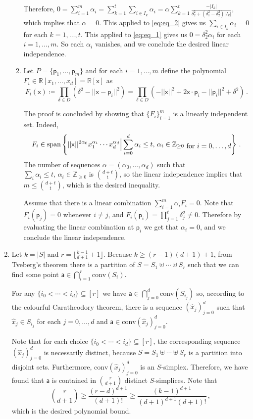 \documentclass[kulak]{tplt}
\theoremstyle{definition}
\newcommand{\R}{\mathbb{R}}
\newcommand{\Z}{\mathbb{Z}}
\newcommand{\vx}{\mathsf{x}}
\newcommand{\va}{\mathsf{a}}
\newcommand{\vp}{\mathsf{p}}
\newcommand{\spn}{\mathrm{span}}
\newcommand{\conv}{\mathrm{conv}}
\begin{document}
\begin{enumerate}
\begin{enumerate}
Therefore, $0 = \sum_{i=1}^m \alpha_i = \sum_{k = 1}^t \sum_{i \in I_k} \alpha_i = \alpha \sum_{k=1}^t \frac{-|I_k|}{\delta_2^2 + (\delta_1^2-\delta_2^2)|I_k|}$, which implies that $\alpha = 0$.
This applied to \eqref{eq:eq_2} gives us $\sum_{i \in I_k} \alpha_i  = 0$ for each $k = 1, \ldots, t$.
This applied to \eqref{eq:eq_1} gives us $ 0 = \delta_2^2 \alpha_ i$ for each $i = 1, \ldots, m$.
So each $\alpha_i $ vanishes, and we conclude the desired linear independence.

\item 
Let $P = \{\vp_1, \ldots, \vp_m \} $ and for each $i=1, \ldots, m$ define the polynomial $F_i \in \R[x_1, \ldots, x_d] = \R[\vx]$ as
$$ F_i ( \vx ) \coloneqq \prod_{\delta \in D} \left( \delta^2 - ||\vx - \vp_i ||^2\right)  =  \prod_{\delta \in D} \left(  - ||\vx ||^2 + 2 \vx \cdot \vp_i - ||\vp_i||^2 + \delta^2\right) \, .$$


The proof is concluded by showing that $\{F_i\}_{i=1}^m$ is a linearly independent set.
Indeed, 
$$F_i \in \spn \left\{ ||\vx||^{2\alpha_0} x_1^{\alpha_1} \cdots x_d^{\alpha_d}\Big| \sum_{i=0}^d \alpha_i \leq t, \, \alpha_i\in \Z_{\geq 0 } \txt{ for $i = 0 , \ldots, d $ }\right\}\, . $$
The number of sequences $\alpha = (\alpha_0, \ldots, \alpha_d)$ such that $ \sum_i \alpha_i \leq t, \, \alpha_i\in \Z_{\geq 0 }$ is $\binom{d+t}{t}$, so the linear independence implies that $m \leq \binom{d+t}{t}$, which is the desired inequality.

Assume that there is a linear combination $ \sum_{i=1}^m \alpha_i F_i = 0 $.
Note that $F_i(\vp_j ) = 0$ whenever $i \neq j$, and $F_i(\vp_i ) = \prod_{j=1}^t \delta_j^2 \neq 0$.
Therefore by evaluating the linear combination at $\vp_i $ we get that $\alpha_i =0$, and we conclude the linear independence.
\end{enumerate}

\item 
Let $k = |S|$ and $r = \lfloor \frac{k-1}{d+1} + 1 \rfloor$.
Because $k \geq (r-1)(d+1) + 1$, from Tveberg's theorem there is a partition of $S = S_1 \uplus \cdots \uplus S_r$ such that we can find some point $\va \in \bigcap_{i=1}^r \conv (S_i)$.

For any $\{i_0 < \cdots < i_d\} \subseteq [r]$ we have $\va \in \bigcap_{j=0}^d \conv (S_{i_j})$ so, according to the colourful Caratheodory theorem, there is a sequence $(\hat{x}_j)_{j=0}^d$ such that $\hat{x}_j\in S_{i_j} $ for each $j = 0, \ldots, d$ and $\va \in \conv (\hat{x}_j)_{j=0}^d$.

Note that for each choice $\{i_0 < \cdots < i_d\} \subseteq [r]$, the corresponding sequence $(\hat{x}_j)_{j=0}^d$ is necessarily distinct, because $S= S_1\uplus \cdots \uplus S_r$ is a partition into disjoint sets.
Furthermore, $\conv (\hat{x}_j)_{j=0}^d $ is an $S$-simplex.
Therefore, we have found that $\va $ is contained in $\binom{r}{d+1}$ distinct $S$-simplices.
Note that 
$$\binom{r}{d+1} \geq \frac{(r-d)^{d+1}}{(d+1)!} \geq \frac{(k-1)^{d+1}}{(d+1)^{d+1} (d+1)!} \, ,$$
which is the desired polynomial bound.


\end{enumerate}
\end{document}
